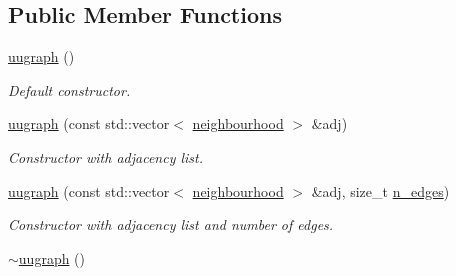 \subsection*{Public Member Functions}
\begin{DoxyCompactItemize}
\item 
\hypertarget{classlgraph_1_1uugraph_ac275347e94a37be322a7757d247494ee}{\hyperlink{classlgraph_1_1uugraph_ac275347e94a37be322a7757d247494ee}{uugraph} ()}\label{classlgraph_1_1uugraph_ac275347e94a37be322a7757d247494ee}

\begin{DoxyCompactList}\small\item\em Default constructor. \end{DoxyCompactList}\item 
\hyperlink{classlgraph_1_1uugraph_a2c0b410c4ce73a01fa120104951ce683}{uugraph} (const std\-::vector$<$ \hyperlink{namespacelgraph_a052e7766c13f3a43cec0aec8173fdede}{neighbourhood} $>$ \&adj)
\begin{DoxyCompactList}\small\item\em Constructor with adjacency list. \end{DoxyCompactList}\item 
\hyperlink{classlgraph_1_1uugraph_aa57cb6b1742370336b80ef7aace303b7}{uugraph} (const std\-::vector$<$ \hyperlink{namespacelgraph_a052e7766c13f3a43cec0aec8173fdede}{neighbourhood} $>$ \&adj, size\-\_\-t \hyperlink{classlgraph_1_1xxgraph_a8ca991d1521cb6ba77e1cd3494ab42be}{n\-\_\-edges})
\begin{DoxyCompactList}\small\item\em Constructor with adjacency list and number of edges. \end{DoxyCompactList}\item 
\hypertarget{classlgraph_1_1uugraph_a5af74a8d824e9fdbef71456c81bccfac}{\hyperlink{classlgraph_1_1uugraph_a5af74a8d824e9fdbef71456c81bccfac}{$\sim$uugraph} ()}\label{classlgraph_1_1uugraph_a5af74a8d824e9fdbef71456c81bccfac}


\end{DoxyCompactItemize}
